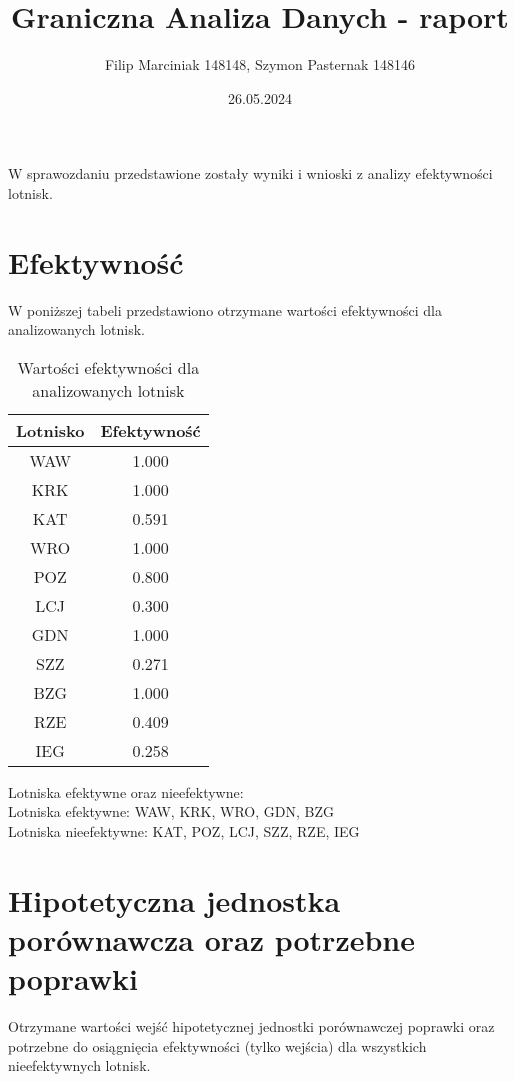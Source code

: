 \documentclass[a4paper,12pt]{article}
\author{{Filip Marciniak 148148, Szymon Pasternak 148146}}
\date{{26.05.2024}}
\title{Graniczna Analiza Danych - raport}
\begin{document}
\maketitle

W sprawozdaniu przedstawione zostały wyniki i wnioski z analizy efektywności lotnisk.

\section{Efektywność}

W poniższej tabeli przedstawiono otrzymane wartości efektywności dla analizowanych lotnisk.
\begin{table}[H]
    \centering
    \begin{tabular}{c|c}
    \hline
         Lotnisko & Efektywność  \\ \hline
         WAW & 1.000 \\
         KRK & 1.000 \\
         KAT & 0.591 \\
         WRO & 1.000 \\
         POZ & 0.800 \\
         LCJ & 0.300 \\
         GDN & 1.000 \\
         SZZ & 0.271 \\
         BZG & 1.000 \\
         RZE & 0.409 \\
         IEG & 0.258 \\
    \end{tabular}
    \caption{Wartości efektywności dla analizowanych lotnisk}
    \label{tab:airports-efficiency}
\end{table}

\noindent Lotniska efektywne oraz nieefektywne: \\
Lotniska efektywne: WAW, KRK, WRO, GDN, BZG \\
Lotniska nieefektywne: KAT, POZ, LCJ, SZZ, RZE, IEG

\section{Hipotetyczna jednostka porównawcza oraz potrzebne poprawki}

Otrzymane wartości wejść hipotetycznej jednostki porównawczej poprawki oraz potrzebne do osiągnięcia efektywności (tylko wejścia) dla wszystkich nieefektywnych lotnisk.
\end{document}
